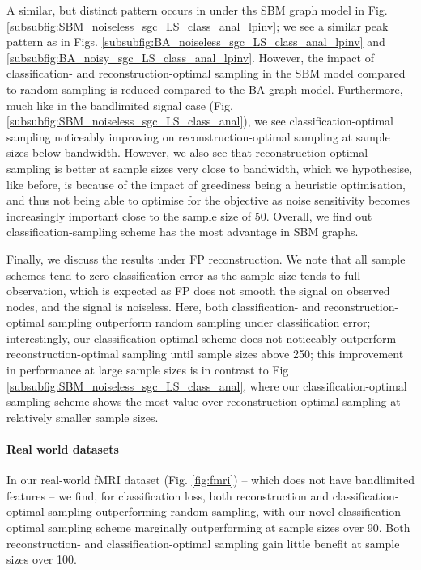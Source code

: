 A similar, but distinct pattern occurs in under ths SBM graph model in Fig. \ref{subsubfig:SBM_noiseless_sgc_LS_class_anal_lpinv}; we see a similar peak pattern as in Figs. \ref{subsubfig:BA_noiseless_sgc_LS_class_anal_lpinv} and \ref{subsubfig:BA_noisy_sgc_LS_class_anal_lpinv}. However, the impact of classification- and reconstruction-optimal sampling in the SBM model compared to random sampling is reduced compared to the BA graph model. Furthermore, much like in the bandlimited signal case (Fig. \ref{subsubfig:SBM_noiseless_sgc_LS_class_anal}), we see classification-optimal sampling noticeably improving on reconstruction-optimal sampling at sample sizes below bandwidth. However, we also see that reconstruction-optimal sampling is better at sample sizes very close to bandwidth, which we hypothesise, like before, is because of the impact of greediness being a heuristic optimisation, and thus not being able to optimise for the objective as noise sensitivity becomes increasingly important close to the sample size of 50. Overall, we find out classification-sampling scheme has the most advantage in SBM graphs.

Finally, we discuss the results under FP reconstruction. We note that all sample schemes tend to zero classification error as the sample size tends to full observation, which is expected as FP does not smooth the signal on observed nodes, and the signal is noiseless. Here, both classification- and reconstruction-optimal sampling outperform random sampling under classification error; interestingly, our classification-optimal scheme does not noticeably outperform reconstruction-optimal sampling until sample sizes above 250; this improvement in performance at large sample sizes is in contrast to Fig \ref{subsubfig:SBM_noiseless_sgc_LS_class_anal}, where our classification-optimal sampling scheme shows the most value over reconstruction-optimal sampling at relatively smaller sample sizes.

\paragraph{Real world datasets}
In our real-world fMRI dataset (Fig. \ref{fig:fmri}) -- which does not have bandlimited features -- we find, for classification loss, both reconstruction and classification-optimal sampling outperforming random sampling, with our novel classification-optimal sampling scheme marginally outperforming at sample sizes over 90. Both reconstruction- and classification-optimal sampling gain little benefit at sample sizes over 100.

